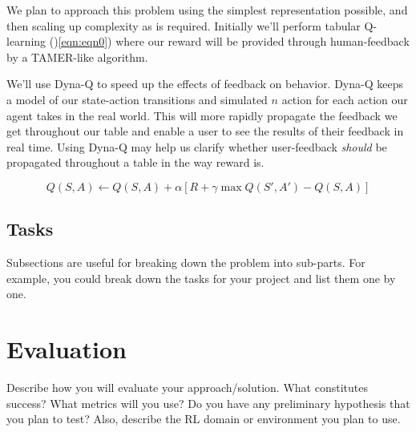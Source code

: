 \documentclass{article}
\begin{document}
We plan to approach this problem using the simplest representation possible, and then scaling up complexity as is required. Initially we'll perform tabular Q-learning ()\ref{eqn:eqn0}) where our reward will be provided through human-feedback by a TAMER-like algorithm. 

We'll use Dyna-Q \cite{sutton_introduction_1998} to speed up the effects of feedback on behavior. Dyna-Q keeps a model of our state-action transitions and simulated $n$ action for each action our agent takes in the real world. This will more rapidly propagate the feedback we get throughout our table and enable a user to see the results of their feedback in real time. Using Dyna-Q may help us clarify whether user-feedback \textit{should} be propagated throughout a table in the way reward is. 

\begin{equation}
    \label{eqn:eqn0}
    Q(S,A) \leftarrow Q(S,A) + \alpha [R + \gamma \max Q(S',A') - Q(S,A)] 
\end{equation}


\subsection{Tasks}

Subsections are useful for breaking down the problem into sub-parts. For example, you could break down the tasks for your project and list them one by one. 



\section{Evaluation}

Describe how you will evaluate your approach/solution. What constitutes success? What metrics will you use? Do you have any preliminary hypothesis that you plan to test? Also, describe the RL domain or environment you plan to use. 
\end{document}
